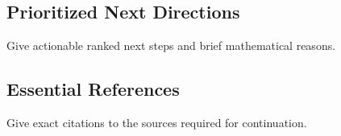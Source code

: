 \documentclass[11pt]{article}
\theoremstyle{definition}
\begin{document}
\subsection*{Prioritized Next Directions}
Give actionable ranked next steps and brief mathematical reasons.

\subsection*{Essential References}
Give exact citations to the sources required for continuation.

\end{document}
